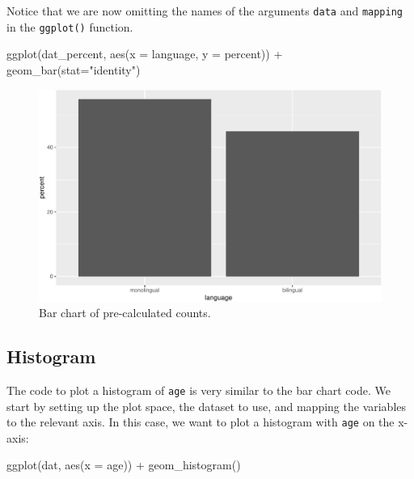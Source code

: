 \documentclass[
  english,
  doc,floatsintext]{apa6}
\newenvironment{Shaded}{\begin{snugshade}}{\end{snugshade}}
\newcommand{\AttributeTok}[1]{\textcolor[rgb]{0.77,0.63,0.00}{#1}}
\newcommand{\FunctionTok}[1]{\textcolor[rgb]{0.00,0.00,0.00}{#1}}
\newcommand{\NormalTok}[1]{#1}
\newcommand{\SpecialCharTok}[1]{\textcolor[rgb]{0.00,0.00,0.00}{#1}}
\newcommand{\StringTok}[1]{\textcolor[rgb]{0.31,0.60,0.02}{#1}}
\begin{document}
Notice that we are now omitting the names of the arguments \texttt{data} and \texttt{mapping} in the \texttt{ggplot()} function.

\begin{Shaded}
\begin{Highlighting}[]
\FunctionTok{ggplot}\NormalTok{(dat\_percent, }\FunctionTok{aes}\NormalTok{(}\AttributeTok{x =}\NormalTok{ language, }\AttributeTok{y =}\NormalTok{ percent)) }\SpecialCharTok{+}
  \FunctionTok{geom\_bar}\NormalTok{(}\AttributeTok{stat=}\StringTok{"identity"}\NormalTok{) }
\end{Highlighting}
\end{Shaded}

\begin{figure}

{\centering \includegraphics[width=1\linewidth]{images/bar-precalc-1} 

}

\caption{Bar chart of pre-calculated counts.}\label{fig:bar-precalc}
\end{figure}

\hypertarget{histogram}{%
\subsection{Histogram}\label{histogram}}

The code to plot a histogram of \texttt{age} is very similar to the bar chart code. We start by setting up the plot space, the dataset to use, and mapping the variables to the relevant axis. In this case, we want to plot a histogram with \texttt{age} on the x-axis:

\begin{Shaded}
\begin{Highlighting}[]
\FunctionTok{ggplot}\NormalTok{(dat, }\FunctionTok{aes}\NormalTok{(}\AttributeTok{x =}\NormalTok{ age)) }\SpecialCharTok{+}
  \FunctionTok{geom\_histogram}\NormalTok{()}
\end{Highlighting}
\end{Shaded}
\end{document}
